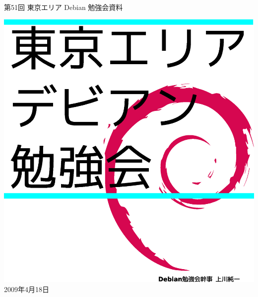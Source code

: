 \documentclass[mingoth,a4paper]{jsarticle}
\newcommand{\debmtgyear}{2009}
\newcommand{\debmtgmonth}{4}
\newcommand{\debmtgdate}{18}
\newcommand{\debmtgnumber}{51}
\begin{document}
\begin{titlepage}
\thispagestyle{empty}


\vspace*{-2cm}
第\debmtgnumber{}回 東京エリア Debian 勉強会資料

\hspace*{-2.4cm}
\includegraphics[width=210mm]{image200801/2008title.eps}\\
\hfill{}\debmtgyear{}年\debmtgmonth{}月\debmtgdate{}日

\end{titlepage}

\end{document}
